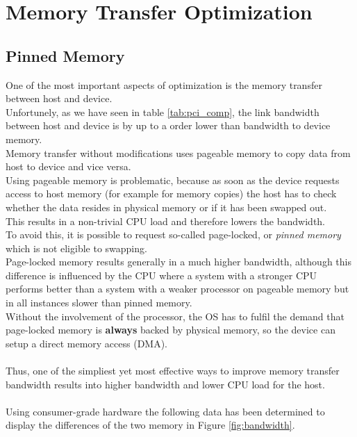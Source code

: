 \section{Memory Transfer Optimization}
\label{sec:transfer}
\subsection{Pinned Memory}
\label{pinned}
One of the most important aspects of optimization is the memory transfer between host and device.\\
Unfortunely, as we have seen in table \ref{tab:pci_comp}, the link bandwidth between host and device is by up to a order lower than bandwidth to device memory.\\
Memory transfer without modifications uses pageable memory to copy data from host to device and vice versa.\\
Using pageable memory is problematic, because as soon as the device requests access to host memory (for example for memory copies)
the host has to check whether the data resides in physical memory or if it has been swapped out.\\
This results in a non-trivial CPU load and therefore lowers the bandwidth.\\
To avoid this, it is possible to request so-called page-locked, or \emph{pinned memory} which is not eligible to swapping.\\
Page-locked memory results generally in a much higher bandwidth, although this difference is influenced by the CPU where a system
with a stronger CPU performs better than a system with a weaker processor on pageable memory but in all instances slower than pinned memory.\\
Without the involvement of the processor, the OS has to fulfil the demand that page-locked memory is \textbf{always} backed by physical memory,
so the device can setup a direct memory access (DMA).\\\\
Thus, one of the simpliest yet most effective ways to improve memory transfer bandwidth results into higher bandwidth and lower CPU load for the host.\\\\
Using consumer-grade hardware the following data has been determined to display the differences of the two memory in Figure \ref{fig:bandwidth}.\\
